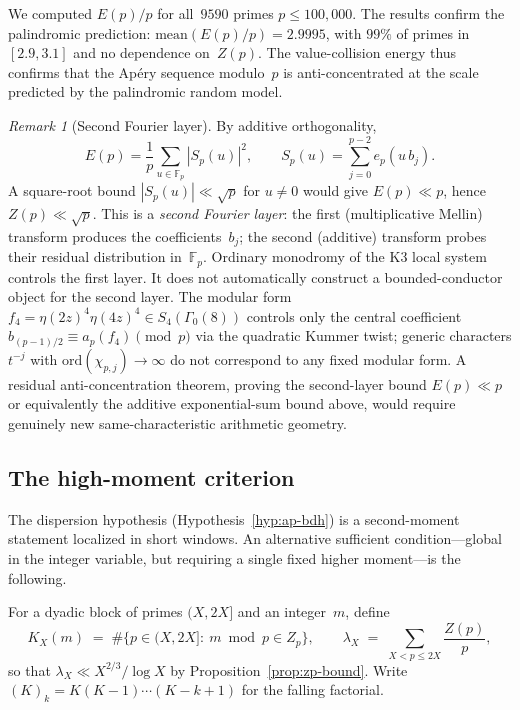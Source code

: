 \documentclass[11pt]{article}
\theoremstyle{definition}
\theoremstyle{remark}
\newtheorem{remark}[theorem]{Remark}
\begin{document}
We computed $E(p)/p$ for all~$9590$ primes
$p \le 100{,}000$. The results confirm
the palindromic prediction:
$\text{mean}(E(p)/p) = 2.9995$,
with $99\%$ of primes in $[2.9, 3.1]$
and no dependence on~$Z(p)$.
The value-collision energy
thus confirms that the Ap\'ery
sequence modulo~$p$ is
anti-concentrated at the scale predicted
by the palindromic random model.

\begin{remark}[Second Fourier layer]
\label{rem:second-fourier}
By additive orthogonality,
\[
  E(p) = \frac{1}{p}\sum_{u \in \mathbb{F}_p}
  |S_p(u)|^2,
  \qquad
  S_p(u) = \sum_{j=0}^{p-2} e_p(u\,b_j).
\]
A square-root bound $|S_p(u)| \ll \sqrt{p}$ for
$u \ne 0$ would give $E(p) \ll p$, hence
$Z(p) \ll \sqrt{p}$.
This is a \emph{second Fourier layer}: the first
(multiplicative Mellin) transform produces the
coefficients~$b_j$; the second (additive)
transform probes their residual distribution
in~$\mathbb{F}_p$.
Ordinary monodromy of the K3 local system controls
the first layer.
It does not automatically construct a bounded-conductor
object for the second layer.
The modular form $f_4 = \eta(2z)^4\eta(4z)^4 \in
S_4(\Gamma_0(8))$ controls only the
central coefficient $b_{(p-1)/2} \equiv a_p(f_4)
\pmod{p}$ via the quadratic Kummer twist;
generic characters $t^{-j}$ with
$\mathrm{ord}(\chi_{p,j}) \to \infty$ do not correspond
to any fixed modular form.
A residual anti-concentration theorem, proving the
second-layer bound $E(p) \ll p$ or equivalently
the additive exponential-sum bound above, would require
genuinely new same-characteristic arithmetic geometry.
\end{remark}

\subsection{The high-moment criterion}\label{ssec:high-moment}

The dispersion hypothesis (Hypothesis~\ref{hyp:ap-bdh}) is a
second-moment statement localized in short windows.
An alternative sufficient condition---global in the integer
variable, but requiring a single fixed higher moment---is
the following.

For a dyadic block of primes $(X, 2X]$ and an integer~$m$,
define
\[
  K_X(m) \;=\; \#\bigl\{p \in (X, 2X] :\ m \bmod p \in Z_p\bigr\},
  \qquad
  \lambda_X \;=\; \sum_{X < p \le 2X} \frac{Z(p)}{p},
\]
so that $\lambda_X \ll X^{2/3}/\log X$ by
Proposition~\ref{prop:zp-bound}.
Write $(K)_k = K(K-1)\cdots(K-k+1)$ for the falling factorial.
\end{document}

